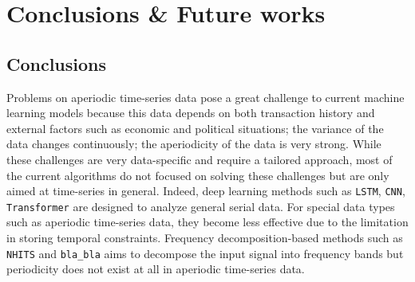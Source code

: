 
\chapter{Conclusions \& Future works}
\label{chap:conclusion}

\section{Conclusions}


Problems on aperiodic time-series data pose a great challenge to current machine learning models because this data depends on both transaction history and external factors such as economic and political situations; the variance of the data changes continuously; the aperiodicity of the data is very strong. While these challenges are very data-specific and require a tailored approach, most of the current algorithms do not focused on solving these challenges but are only aimed at time-series in general. Indeed, deep learning methods such as \verb|LSTM|, \verb|CNN|, \verb|Transformer| are designed to analyze general serial data. For special data types such as aperiodic time-series data, they become less effective due to the limitation in storing temporal constraints. Frequency decomposition-based methods such as \verb|NHITS| and \verb|bla_bla| aims to decompose the input signal into frequency bands but periodicity does not exist at all in aperiodic time-series data.

